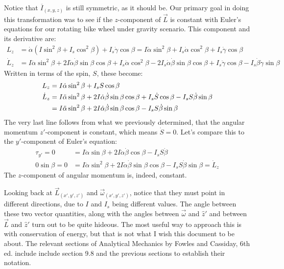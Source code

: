 \documentclass[10pt]{article}
\begin{document}
Notice that $\overline{I}_{(x,y,z)}$ is still symmetric, as it should be. Our 
primary goal in doing this transformation was to see if 
the $z$-component of $\vec{L}$ is constant with Euler's equations 
for our rotating bike wheel under gravity scenario. This component and 
its derivative are:
\begin{align*}
    L_z &=\dot\alpha(I\sin^2\beta+I_s\cos^2\beta)+I_s\dot\gamma\cos\beta 
        =I\dot\alpha\sin^2\beta+I_s\dot\alpha\cos^2\beta
        +I_s\dot\gamma\cos\beta \\
    \dot{L}_z &=
        I\ddot\alpha\sin^2\beta+2I\dot\alpha\dot\beta\sin\beta\cos\beta
        +I_s\ddot\alpha\cos^2\beta-2I_s\dot\alpha\dot\beta\sin\beta\cos\beta
        +I_s\ddot\gamma\cos\beta -I_s\dot\beta\dot\gamma\sin\beta
\end{align*}
Written in terms of the spin, $S$, these become:
\begin{align}
     L_z &=I\dot\alpha\sin^2\beta +I_sS\cos\beta \\
     \dot{L}_z&=I\ddot\alpha\sin^2\beta+2I\dot\alpha\dot\beta\sin\beta\cos\beta 
            + I_s\dot S\cos\beta - I_sS\dot\beta\sin\beta \notag\\
        &=I\ddot\alpha\sin^2\beta+2I\dot\alpha\dot\beta\sin\beta\cos\beta 
            - I_sS\dot\beta\sin\beta
\end{align}
The very last line follows from what we previously determined, that
the angular momentum $z'$-component is constant, which means $\dot S=0$.
Let's compare this to the $y'$-component of Euler's equation:
\begin{align*}
    \tau_{y'} = 0 &= 
        I\ddot\alpha\sin\beta + 2I\dot\alpha\dot\beta\cos\beta 
            -I_sS\dot\beta \\
    0\sin\beta= 0 &=
        I\ddot\alpha\sin^2\beta + 2I\dot\alpha\dot\beta\sin\beta\cos\beta 
            -I_sS\dot\beta\sin\beta = \dot{L}_z
\end{align*}
The $z$-component of angular momentum is, indeed, constant.

Looking back at $\vec{L}_{(x',y',z')}$ and $\vec{\omega}_{(x',y',z')}$, 
notice that they must point in different directions, due to $I$ and $I_s$
being different values. The angle between these 
two vector quantities, along with the angles 
between $\vec{\omega}$ and $\hat{z}'$ and between $\vec{L}$ and $\hat{z}'$
turn out to be quite hideous. The most useful way to approach this 
is with conservation of energy, but that is not what I wish this 
document to be about. The relevant sections of Analytical Mechanics by 
Fowles and Cassiday, 6th ed. include include section 9.8 and the previous 
sections to establish their notation.
\end{document}
